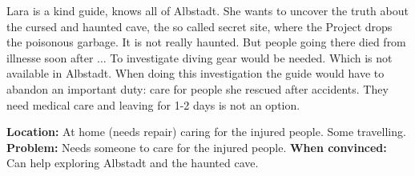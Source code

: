 \begin{npcBox}[title=Lara]
    \begin{consequences}
    \item {}
    \item {}
    \item {}
    \end{consequences}
    
    \begin{npcDescription}
    Lara is a kind guide, knows all of Albstadt. She wants to uncover the truth about the cursed and haunted cave, the so called secret site, where the Project drops the poisonous garbage. It is not really haunted. But people going there died from illnesse soon after ...
    To investigate diving gear would be needed. Which is not available in Albstadt.
    When doing this investigation the guide would have to abandon an important duty: care for people she rescued after accidents. They need medical care and leaving for 1-2 days is not an option.

    \textbf{Location:} At home (needs repair) caring for the injured people. Some travelling.
    \textbf{Problem:} Needs someone to care for the injured people. 
    \textbf{When convinced:} Can help exploring Albstadt and the haunted cave.
    \end{npcDescription}
    
\end{npcBox}

\newpage

